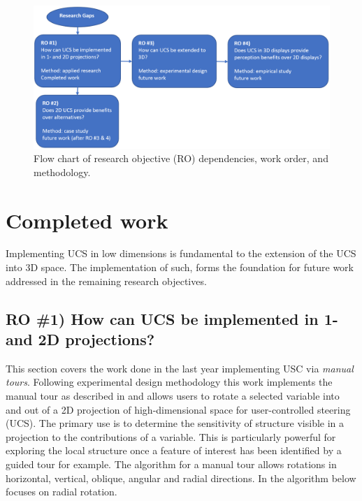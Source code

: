 \documentclass{monashthesis}
\begin{document}
\begin{figure}

{\centering \includegraphics[width=1\linewidth]{./figures/ProjectOverview} 

}

\caption{Flow chart of research objective (RO)
dependencies, work order, and methodology.}\label{fig:ProjectOverview}
\end{figure}

\chapter{Completed work}\label{ch:completed_work}

Implementing UCS in low dimensions is fundamental to the extension of
the UCS into 3D space. The implementation of such, forms the foundation
for future work addressed in the remaining research objectives.

\section{RO \#1) How can UCS be implemented in 1- and 2D
projections?}\label{ro-1-how-can-ucs-be-implemented-in-1--and-2d-projections}

This section covers the work done in the last year implementing USC via
\emph{manual tours}. Following experimental design methodology this work
implements the manual tour as described in \textcite{cook_manual_1997}
and allows users to rotate a selected variable into and out of a 2D
projection of high-dimensional space for user-controlled steering (UCS).
The primary use is to determine the sensitivity of structure visible in
a projection to the contributions of a variable. This is particularly
powerful for exploring the local structure once a feature of interest
has been identified by a guided tour \autocite{cook_grand_1995} for
example. The algorithm for a manual tour allows rotations in horizontal,
vertical, oblique, angular and radial directions. In the algorithm below
focuses on radial rotation.
\end{document}
